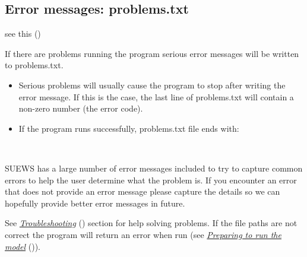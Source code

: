 \documentclass[letterpaper,10pt,english]{sphinxmanual}
\begin{document}
\subsection{Error messages: problems.txt}
\label{\detokenize{output_files/output_files:error-messages-problems-txt}}
see this {\hyperref[\detokenize{output_files/output_files:output-files}]{}} ()

If there are problems running the program serious error messages will be
written to problems.txt.
\begin{itemize}
\item {} 
Serious problems will usually cause the program to stop after writing
the error message. If this is the case, the last line of problems.txt
will contain a non-zero number (the error code).

\item {} 
If the program runs successfully, problems.txt file ends with:

%
\begin{sphinxVerbatim}[commandchars=\\\{\}]
 
\end{sphinxVerbatim}

\end{itemize}

SUEWS has a large number of error messages included to try to capture
common errors to help the user determine what the problem is. If you
encounter an error that does not provide an error message please capture
the details so we can hopefully provide better error messages in future.

See {\hyperref[\detokenize{output_files/output_files:Troubleshooting}]{\emph{Troubleshooting}}} () section for help solving
problems. If the file paths are not correct the program will return an
error when run (see {\hyperref[\detokenize{output_files/output_files:Preparing_to_run_the_model}]{\emph{Preparing to run the
model}}} ()).
\end{document}
